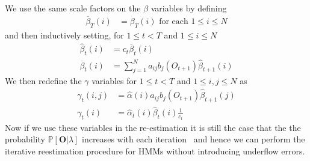 We use the same scale factors on the $\beta$ variables by defining
\begin{align*}
\overline{\beta}_{T}(i) &= \beta_{T}(i) \text{ for each $1 \leq i \leq N$}
\end{align*}
and then inductively setting, for $1\leq t < T$ and $1 \leq i \leq N$
\begin{align*}
\hat{\beta}_{t}(i) &= c_t\overline{\beta}_t(i)\\
\overline{\beta}_{t}(i) &= \sum_{j=1}^{N}a_{ij}b_j(O_{t+1})\hat{\beta}_{t+1}(i)
\end{align*}
We then redefine the $\gamma$ variables for $1 \leq t < T$ and $1 \leq i,j \leq N$ as 
\begin{align*}
\gamma_t(i,j)&=\hat{\alpha}(i)a_{ij}b_j(O_{t+1})\hat{\beta}_{t+1}(j)\\
\gamma_t(i) &= \hat{\alpha}_t(i)\hat{\beta}_t(i)\frac{1}{c_t}
\end{align*}
Now if we use these variables in the re-estimation it is still the case that the the probability $\mathbb{P}[\mathbf{O}|\lambda]$ increases with each iteration~\citep{rabiner1989tutorial} and hence we can perform the iterative reestimation procedure for HMMs without introducing underflow errors.


